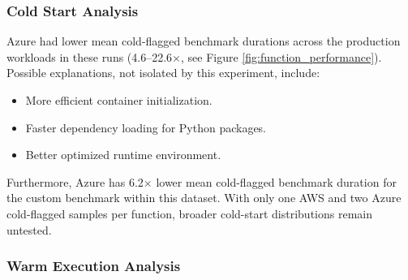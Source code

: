 \documentclass[sigconf,nonacm]{acmart}
\begin{document}
\begin{table}[t]
\centering
\caption{Function Benchmark Performance Comparison}
\label{tab:function_results}
\end{table}

\subsubsection{Cold Start Analysis}

Azure had lower mean cold-flagged benchmark durations across the production workloads in these runs (4.6--22.6$\times$, see Figure \ref{fig:function_performance}). Possible explanations, not isolated by this experiment, include:
\begin{itemize}
    \item More efficient container initialization.
    \item Faster dependency loading for Python packages.
    \item Better optimized runtime environment.
\end{itemize}

Furthermore, Azure has 6.2$\times$ lower mean cold-flagged benchmark duration for the custom benchmark within this dataset. With only one AWS and two Azure cold-flagged samples per function, broader cold-start distributions remain untested. 

\subsubsection{Warm Execution Analysis}
\end{document}

